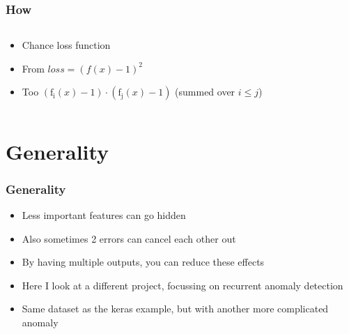 \documentclass[hyperref={pdfpagelabels=false}]{beamer}
\begin{document}
\begin{frame}[label=How]
\frametitle{How}
\begin{columns}[c] %
\begin{column}{0.48\textwidth}%
\begin{itemize}

    \item Chance loss function

    \item From $loss = \left(f{\left(x \right)} - 1\right)^{2}$

    \item Too $\left(\operatorname{f_{i}}{\left(x \right)} - 1\right) \cdot \left(\operatorname{f_{j}}{\left(x \right)} - 1\right)$ (summed over $i \leq j$)


\end{itemize}
\end{column}%
\hfill%
\begin{column}{0.48\textwidth}%

\end{column}%
\hfill%
\end{columns}

\end{frame}



\newpage
\section{Generality}\label{sec:Generality}



\begin{frame}[label=Generality]
\frametitle{Generality}
\begin{itemize}

    \item Less important features can go hidden

    \item Also sometimes 2 errors can cancel each other out

    \item By having multiple outputs, you can reduce these effects

    \item Here I look at a different project, focussing on recurrent anomaly detection

    \item Same dataset as the keras example, but with another more complicated anomaly


\end{itemize}
\end{frame}
\end{document}
